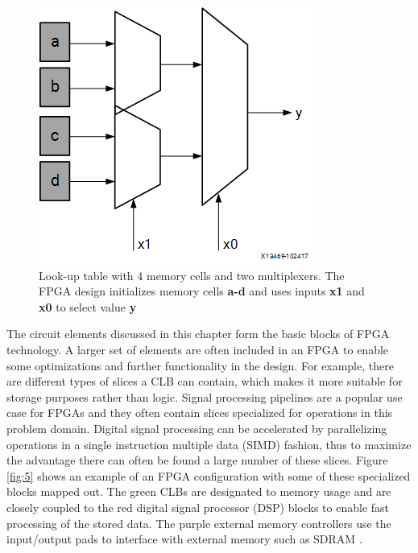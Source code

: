 \documentclass[12pt]{report}
\begin{document}
\begin{figure}[h]
    \centering
    \includegraphics[scale=0.5]{figures/lut.png}
    \caption{Look-up table with 4 memory cells and two multiplexers. The FPGA design initializes memory cells \textbf{a-d} and uses inputs \textbf{x1} and \textbf{x0} to select value \textbf{y} \citep{XilFPGAIntro}}
    \label{fig:4}
\end{figure}

The circuit elements discussed in this chapter form the basic blocks of FPGA technology. A larger set of elements are often included in an FPGA to enable some optimizations and further functionality in the design. For example, there are different types of slices a CLB can contain, which makes it more suitable for storage purposes rather than logic. Signal processing pipelines are a popular use case for FPGAs and they often contain slices specialized for operations in this problem domain. Digital signal processing can be accelerated by parallelizing operations in a single instruction multiple data (SIMD) fashion, thus to maximize the advantage there can often be found a large number of these slices. Figure \ref{fig:5} shows an example of an FPGA configuration with some of these specialized blocks mapped out. The green CLBs are designated to memory usage and are closely coupled to the red digital signal processor (DSP) blocks to enable fast processing of the stored data. The purple external memory controllers use the input/output pads to interface with external memory such as SDRAM \citep{XilFPGAIntro} \citep{XilClbMan}.
\end{document}
